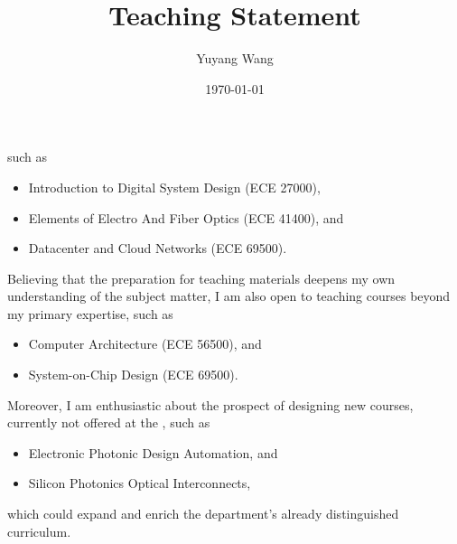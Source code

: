 



\title{Teaching Statement}

\def\courseOneName{Introduction to Digital System Design}
\def\courseOneNumber{ECE 27000}
\def\courseTwoName{Elements of Electro And Fiber Optics}
\def\courseTwoNumber{ECE 41400}
\def\courseThreeName{Datacenter and Cloud Networks}
\def\courseThreeNumber{ECE 69500}
\def\courseFourName{Computer Architecture}
\def\courseFourNumber{ECE 56500}
\def\courseFiveName{System-on-Chip Design}
\def\courseFiveNumber{ECE 69500}
\def\courseSixName{Electronic Photonic Design Automation}
\def\courseSevenName{Silicon Photonics Optical Interconnects}

\def\rsCustom{%
such as 
\begin{itemize}[nosep]
    \item \courseOneName{} (\courseOneNumber{}),
    \item \courseTwoName{} (\courseTwoNumber{}), and
    \item \courseThreeName{} (\courseThreeNumber{}).
\end{itemize}
Believing that the preparation for teaching materials deepens my own understanding of the subject matter, I am also open to teaching courses beyond my primary expertise, such as
\begin{itemize}[nosep]
    \item \courseFourName{} (\courseFourNumber{}), and
    \item \courseFiveName{} (\courseFiveNumber{}).
\end{itemize}
Moreover, I am enthusiastic about the prospect of designing new courses, currently not offered at the \appSchool{}, such as
\begin{itemize}[nosep]
    \item \courseSixName{}, and 
    \item \courseSevenName{},
\end{itemize}
which could expand and enrich the department's already distinguished curriculum.
}

\author{Yuyang Wang}
\date{\today}
\makeatletter
\fancyfoot[L]{\scshape \MakeLowercase{\@author}}
\fancyfoot[R]{{\scshape \MakeLowercase{\@title}}\quad{\LARGE\sfrac{\thepage}{\pageref*{LastPage}}}}
\makeatother



\maketitle%
\thispagestyle{fancy}


\rsCustom{}


\footnotesize


